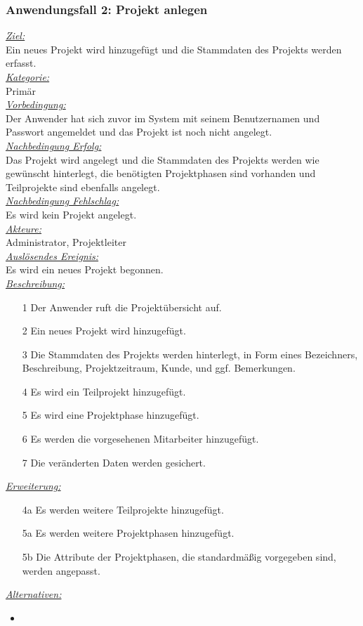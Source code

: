 \subsubsection{Anwendungsfall 2: Projekt anlegen}
\underline{\emph{Ziel:}}\\
Ein neues Projekt wird hinzugefügt und die Stammdaten des Projekts werden erfasst.\\
\underline{\emph{Kategorie:}} \\
Primär\\
\underline{\emph{Vorbedingung:}} \\
Der Anwender hat sich zuvor im System mit seinem Benutzernamen und Passwort angemeldet und das Projekt ist noch nicht angelegt.\\
\underline{\emph{Nachbedingung Erfolg:}} \\
Das Projekt wird angelegt und die Stammdaten des Projekts werden wie gewünscht hinterlegt, die benötigten Projektphasen sind vorhanden und Teilprojekte sind ebenfalls angelegt.\\
\underline{\emph{Nachbedingung Fehlschlag:}} \\
Es wird kein Projekt angelegt.\\
\underline{\emph{Akteure:}} \\
Administrator, Projektleiter\\
\underline{\emph{Auslösendes Ereignis:}} \\
Es wird ein neues Projekt begonnen.\\
\underline{\emph{Beschreibung:}}
\begin{itemize}
    \item [1] Der Anwender ruft die Projektübersicht auf.
    \item [2] Ein neues Projekt wird hinzugefügt.
    \item [3] Die Stammdaten des Projekts werden hinterlegt, in Form eines Bezeichners, Beschreibung, Projektzeitraum, Kunde, und ggf. Bemerkungen.
    \item [4] Es wird ein Teilprojekt hinzugefügt.
    \item [5] Es wird eine Projektphase hinzugefügt.
    \item [6] Es werden die vorgesehenen Mitarbeiter hinzugefügt.
    \item [7] Die veränderten Daten werden gesichert.
\end{itemize}
\underline{\emph{Erweiterung:}} \\
\begin{itemize}
    \item [4a] Es werden weitere Teilprojekte hinzugefügt. 
    \item [5a] Es werden weitere Projektphasen hinzugefügt.
    \item [5b] Die Attribute der Projektphasen, die standardmäßig vorgegeben sind, werden angepasst. 
\end{itemize}
\underline{\emph{Alternativen:}} \\
\begin{itemize}
    \item  
\end{itemize}

